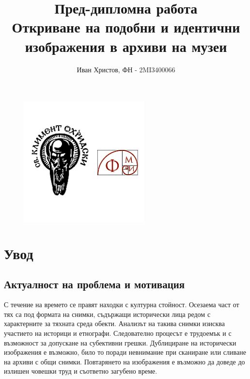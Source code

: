 \documentclass[a4paper,12pt]{article}
\begin{document}
\title{
    Пред-дипломна работа\\
    \large Откриване на подобни и идентични изображения в архиви на музеи}
\author{Иван Христов, ФН - 2MI3400066}

\maketitle

\begin{figure}[h]
    \centering
    \includegraphics[width=250px]{fmi.png}
    \label{fig:fmi}
\end{figure}

\pagebreak

\tableofcontents
\pagebreak

\section{Увод}

\subsection{Актуалност на проблема и мотивация}

С течение на времето се правят находки с културна стойност. Осезаема част от тях са под формата на снимки, съдържащи исторически лица редом с характерните за тяхната среда обекти. Анализът на такива снимки изисква участието на историци и етнографи. Следователно процесът е трудоемък и с възможност за допускане на субективни грешки. Дублициране на исторически изображения е възможно, било то поради невнимание при сканиране или сливане на архиви с общи снимки. Повтарянето на изображения е възможно да доведе до излишен човешки труд и съответно загубено време.
\end{document}
